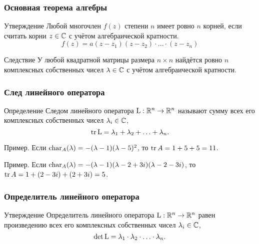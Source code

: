 \begin{frame}
    \frametitle{Основная теорема алгебры}
    \begin{block}{Утверждение}
        Любой многочлен $f(z)$ степени $n$ имеет ровно $n$ корней,
        если считать корни $z\in \mathbb{C}$ с учётом алгебраической кратности.
\pause
\[
f(z) = a(z-z_1)(z-z_2)\cdot \ldots \cdot (z-z_n)    
\]
    \end{block}    

    \pause
    \begin{block}{Следствие}
        У любой квадратной матрицы размера $n\times n$ найдётся ровно $n$ 
        комплексных собственных чисел $\lambda \in \mathbb{C}$ с учётом алгебраической кратности.
    \end{block}


\end{frame}




\begin{frame}
    \frametitle{След линейного оператора}

    \begin{block}{Определение}
        \alert{Следом} линейного оператора $\operatorname{L}:\mathbb{R}^n\to\mathbb{R}^n$ называют сумму всех его комплексных собственных чисел $\lambda_i \in \mathbb{C}$,
        \[
        \trace \LL = \lambda_1 + \lambda_2 + \ldots + \lambda_n.
        \]
    \end{block}

    \pause
    Пример. Если $\operatorname{char}_{A}(\lambda) = -(\lambda-1)(\lambda-5)^2$, то $\trace A = 1 + 5 + 5 = 11$.

    \pause
    Пример. Если $\operatorname{char}_{A}(\lambda) = -(\lambda-1)(\lambda-2+3i)(\lambda-2-3i)$, то $\trace A = 1 + (2-3i) + (2+3i) = 5$.

\end{frame}



\begin{frame}
    \frametitle{Определитель линейного оператора}

    \begin{block}{Утверждение}
        Определитель линейного оператора $\operatorname{L}:\mathbb{R}^n\to\mathbb{R}^n$ равен произведению всех его комплексных собственных чисел $\lambda_i \in \mathbb{C}$,
        \[
        \det \operatorname{L} = \lambda_1 \cdot \lambda_2 \cdot \ldots \cdot \lambda_n.
        \]
    \end{block}


\end{frame}

